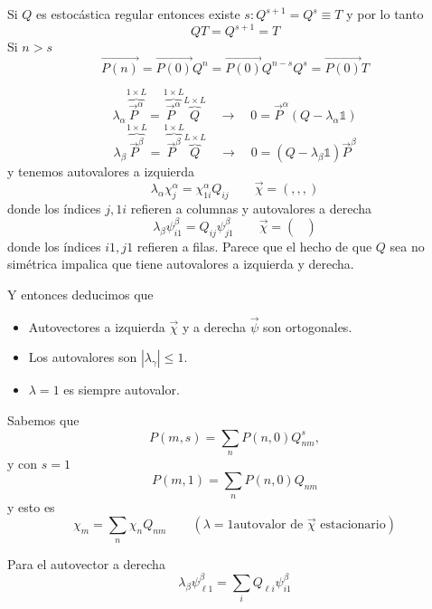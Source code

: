 \documentclass[10pt,oneside]{CBFT_book}
\begin{document}
Si $Q$ es estocástica regular entonces existe $s : Q^{s+1} = Q^s \equiv T$ y por lo tanto
\[
	Q T = Q^{s+1} = T
\]
Si $n>s$
\[
	\vec{P(n)} = \vec{P(0)} Q^n = \vec{P(0)} Q^{n-s} Q^s = \vec{P(0)} T
\]

\[
	\lambda_\alpha \overbrace{\vec{P}^\alpha}^{1\times L} =  
	\overbrace{\vec{P}^\alpha}^{1\times L} \overbrace{Q}^{L\times L}
	\quad \rightarrow \quad 0 = \vec{P}^\alpha (Q-\lambda_\alpha \mathbb{1}) 
\]
\[
	\lambda_\beta \overbrace{\vec{P}^\beta}^{1\times L} = 
	\overbrace{\vec{P}^\beta}^{1\times L} \overbrace{Q}^{L\times L}
	\quad \rightarrow \quad  0 = (Q-\lambda_\beta \mathbb{1}) \vec{P}^\beta
\]
y tenemos autovalores a izquierda
\[
	\lambda_\alpha \chi_j^\alpha = \chi_{1i}^\alpha Q_{ij} \qquad \vec{\chi} = (,,,)
\]
donde los índices $j,1i$ refieren a columnas y autovalores a derecha
\[
	\lambda_\beta \psi_{i1}^\beta = Q_{ij} \psi_{j1}^\beta \qquad \vec{\chi} = 
									\begin{pmatrix}
									\\
                                                                        \\
                                                                        
                                                                        \end{pmatrix}
\]
donde los índices $i1,j1$ refieren a filas.
Parece que el hecho de que $Q$ sea no simétrica impalica que tiene autovalores a izquierda
y derecha.


Y entonces deducimos que 
\begin{itemize}
 \item Autovectores a izquierda $\vec{\chi}$ y a derecha $\vec{\psi}$ son ortogonales.
 \item Los autovalores son $|\lambda_\gamma|\leq 1$.
 \item $\lambda = 1$ es siempre autovalor.
\end{itemize}

Sabemos que 
\[
	P(m,s) = \sum_n P(n,0) Q^s_{nm},
\]
y con $s=1$
\[
	P(m,1) = \sum_n P(n,0) Q_{nm}
\]
y esto es 
\[
	\chi_m = \sum_n \chi_n Q_{nm}  \qquad (\lambda=1 \text{autovalor de $\vec{\chi}$ 
estacionario})
\]

Para el autovector a derecha 
\[
	\lambda_\beta \psi_{\ell 1}^\beta = \sum_i Q_{\ell i} \psi_{i1}^\beta
\]
\end{document}
